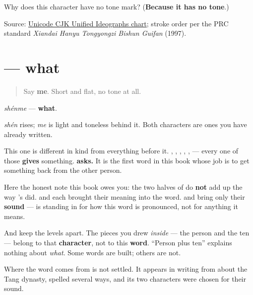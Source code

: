 \begin{tcolorbox}[breakable,colback=teal!4,colframe=teal!35!black,title={Before you move on}]
Why does this character have no tone mark? (\textbf{Because it has no tone}.)

Source: \href{https://www.unicode.org/charts/PDF/U4E00.pdf}{Unicode CJK Unified Ideographs chart}; stroke order per the PRC standard \emph{Xiandai Hanyu Tongyongzi Bishun Guifan} (1997).
\end{tcolorbox}
\section[\texorpdfstring{\zh{什么} (shénme)}{什么 (shénme)}]{ — what}

\label{lesson:ZH-C09-shenme}



\begin{quote}
Say \textbf{me}. Short and flat, no tone at all.
\end{quote}

\begin{cousinweb}
\textbf{} \emph{shénme} — \textbf{what}.

\emph{shén} rises; \emph{me} is light and toneless behind it. Both characters are ones you have already written.

This one is different in kind from everything before it. , , , , ,  — every one of those \textbf{gives} something. \textbf{ asks.} It is the first word in this book whose job is to get something back from the other person.

Here the honest note this book owes you: the two halves of  do \textbf{not} add up the way 's did.  and  each brought their meaning into the word.  and  bring only their \textbf{sound} —  is standing in for how this word is pronounced, not for anything it means.

And keep the levels apart. The pieces you drew \emph{inside}  — the person and the ten — belong to that \textbf{character}, not to this \textbf{word}. \textquotedblleft{}Person plus ten\textquotedblright{} explains nothing about \emph{what}. Some words are built; others are not.

Where the word comes from is not settled. It appears in writing from about the Tang dynasty, spelled several ways, and its two characters were chosen for their sound.
\end{cousinweb}


